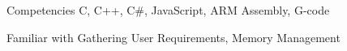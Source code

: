 


\begin{cvskills}


  \cvskill
  {Competencies}
  {C, C++, C#, JavaScript, ARM Assembly, G-code}


  \cvskill
  {Familiar with}
  {Gathering User Requirements, Memory Management}


\end{cvskills}